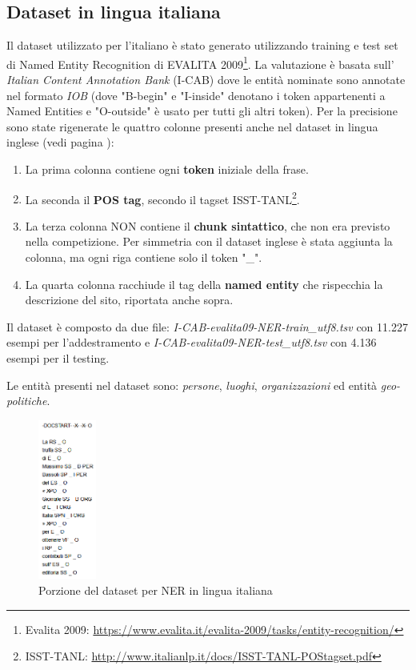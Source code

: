 \subsection{Dataset in lingua italiana} \label{ner_ita_data}
\label{sec:ner_dataset_it}
Il dataset utilizzato per l'italiano è stato generato utilizzando training e test set di Named Entity Recognition di EVALITA 2009\footnote{Evalita 2009: \href{https://www.evalita.it/evalita-2009/tasks/entity-recognition/}{https://www.evalita.it/evalita-2009/tasks/entity-recognition/}}. La valutazione è basata sull' \textit{Italian Content Annotation Bank} (I-CAB) dove le entità nominate sono annotate nel formato \textit{IOB} (dove "B-begin" e "I-inside" denotano i token appartenenti a Named Entities e "O-outside" è usato per tutti gli altri token). Per la precisione sono state rigenerate le quattro colonne presenti anche nel dataset in lingua inglese (vedi pagina \pageref{sec:ner_dataset_en}):
\begin{enumerate}
    \item La prima colonna contiene ogni \textbf{token} iniziale della frase.
    \item La seconda il \textbf{POS tag}, secondo il tagset ISST-TANL\footnote{ISST-TANL: \href{http://www.italianlp.it/docs/ISST-TANL-POStagset.pdf}{http://www.italianlp.it/docs/ISST-TANL-POStagset.pdf}}.
    \item  La terza colonna NON contiene il \textbf{chunk sintattico}, che non era previsto nella competizione. Per simmetria con il dataset inglese è stata aggiunta la colonna, ma ogni riga contiene solo il token "\_".
    \item La quarta colonna racchiude il tag della \textbf{named entity} che rispecchia la descrizione del sito, riportata anche sopra.
\end{enumerate}
Il dataset è composto da due file: \textit{I-CAB-evalita09-NER-train\_utf8.tsv} con 11.227 esempi per l’addestramento e \textit{I-CAB-evalita09-NER-test\_utf8.tsv} con 4.136 esempi per il testing.

Le entità presenti nel dataset sono: \textit{persone}, \textit{luoghi}, \textit{organizzazioni} ed entità \textit{geo-politiche}.
\begin{figure}[hbt!]
    \centering
    \includegraphics[width=0.17\textwidth]{img/ner_it_dataset.png}
    \caption{Porzione del dataset per NER in lingua italiana}
    \label{fig:ner_it_dataset}
\end{figure}
